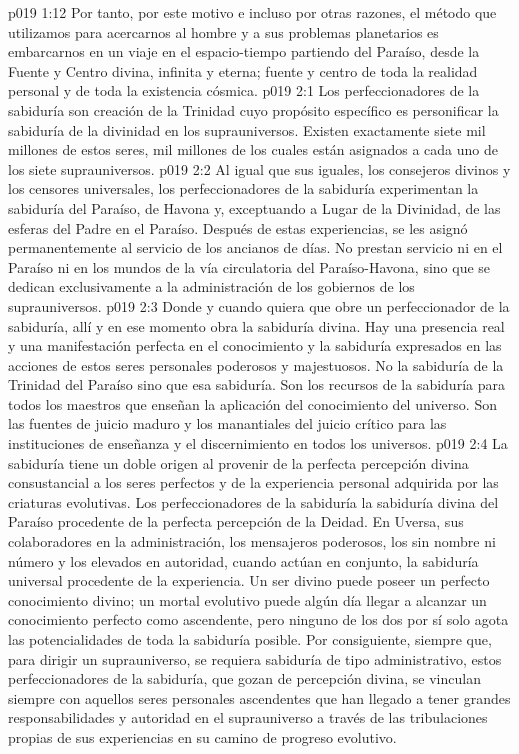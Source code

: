 \vs p019 1:12 \pc Por tanto, por este motivo e incluso por otras razones, el método que utilizamos para acercarnos al hombre y a sus problemas planetarios es embarcarnos en un viaje en el espacio\hyp{}tiempo partiendo del Paraíso, desde la Fuente y Centro divina, infinita y eterna; fuente y centro de toda la realidad personal y de toda la existencia cósmica.
\vs p019 2:1 Los perfeccionadores de la sabiduría son creación de la Trinidad cuyo propósito específico es personificar la sabiduría de la divinidad en los suprauniversos. Existen exactamente siete mil millones de estos seres, mil millones de los cuales están asignados a cada uno de los siete suprauniversos.
\vs p019 2:2 Al igual que sus iguales, los consejeros divinos y los censores universales, los perfeccionadores de la sabiduría experimentan la sabiduría del Paraíso, de Havona y, exceptuando a Lugar de la Divinidad, de las esferas del Padre en el Paraíso. Después de estas experiencias, se les asignó permanentemente al servicio de los ancianos de días. No prestan servicio ni en el Paraíso ni en los mundos de la vía circulatoria del Paraíso\hyp{}Havona, sino que se dedican exclusivamente a la administración de los gobiernos de los suprauniversos.
\vs p019 2:3 \pc Donde y cuando quiera que obre un perfeccionador de la sabiduría, allí y en ese momento obra la sabiduría divina. Hay una presencia real y una manifestación perfecta en el conocimiento y la sabiduría expresados en las acciones de estos seres personales poderosos y majestuosos. No  la sabiduría de la Trinidad del Paraíso sino que  esa sabiduría. Son los recursos de la sabiduría para todos los maestros que enseñan la aplicación del conocimiento del universo. Son las fuentes de juicio maduro y los manantiales del juicio crítico para las instituciones de enseñanza y el discernimiento en todos los universos.
\vs p019 2:4 La sabiduría tiene un doble origen al provenir de la perfecta percepción divina consustancial a los seres perfectos y de la experiencia personal adquirida por las criaturas evolutivas. Los perfeccionadores de la sabiduría  la sabiduría divina del Paraíso procedente de la perfecta percepción de la Deidad. En Uversa, sus colaboradores en la administración, los mensajeros poderosos, los sin nombre ni número y los elevados en autoridad, cuando actúan en conjunto,  la sabiduría universal procedente de la experiencia. Un ser divino puede poseer un perfecto conocimiento divino; un mortal evolutivo puede algún día llegar a alcanzar un conocimiento perfecto como ascendente, pero ninguno de los dos por sí solo agota las potencialidades de toda la sabiduría posible. Por consiguiente, siempre que, para dirigir un suprauniverso, se requiera sabiduría de tipo administrativo, estos perfeccionadores de la sabiduría, que gozan de percepción divina, se vinculan siempre con aquellos seres personales ascendentes que han llegado a tener grandes responsabilidades y autoridad en el suprauniverso a través de las tribulaciones propias de sus experiencias en su camino de progreso evolutivo.
